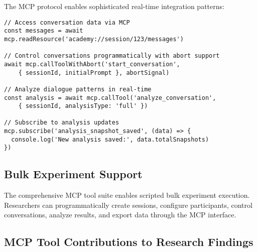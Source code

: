 \documentclass[11pt,letterpaper]{article}
\begin{document}
The MCP protocol enables sophisticated real-time integration patterns:

\begin{verbatim}
// Access conversation data via MCP
const messages = await mcp.readResource('academy://session/123/messages')

// Control conversations programmatically with abort support
await mcp.callToolWithAbort('start_conversation', 
    { sessionId, initialPrompt }, abortSignal)

// Analyze dialogue patterns in real-time
const analysis = await mcp.callTool('analyze_conversation', 
    { sessionId, analysisType: 'full' })

// Subscribe to analysis updates
mcp.subscribe('analysis_snapshot_saved', (data) => {
  console.log('New analysis saved:', data.totalSnapshots)
})
\end{verbatim}

\subsection{Bulk Experiment Support}

The comprehensive MCP tool suite enables scripted bulk experiment execution. Researchers can programmatically create sessions, configure participants, control conversations, analyze results, and export data through the MCP interface. \subsection{MCP Tool Contributions to Research Findings}
\end{document}
